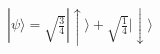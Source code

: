 \documentclass[preview]{standalone}
\begin{document}
\begin{align*}
|\psi\rangle = \sqrt{\frac{3}{4}}|\uparrow\rangle + \sqrt{\frac{1}{4}}|\downarrow\rangle
\end{align*}
\end{document}
